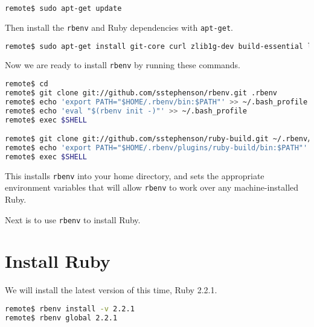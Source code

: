 \begin{minipage}{\linewidth}
\begin{lstlisting}[language=bash]
remote$ sudo apt-get update
\end{lstlisting}
\end{minipage}

Then install the \texttt{rbenv} and Ruby dependencies with \texttt{apt-get}.

\begin{minipage}{\linewidth}
\begin{lstlisting}[language=bash]
remote$ sudo apt-get install git-core curl zlib1g-dev build-essential libssl-dev libreadline-dev libyaml-dev libsqlite3-dev sqlite3 libxml2-dev libxslt1-dev libcurl4-openssl-dev python-software-properties libffi-dev
\end{lstlisting}
\end{minipage}

Now we are ready to install \texttt{rbenv} by running these commands.

\begin{minipage}{\linewidth}
\begin{lstlisting}[language=bash]
remote$ cd
remote$ git clone git://github.com/sstephenson/rbenv.git .rbenv
remote$ echo 'export PATH="$HOME/.rbenv/bin:$PATH"' >> ~/.bash_profile
remote$ echo 'eval "$(rbenv init -)"' >> ~/.bash_profile
remote$ exec $SHELL

remote$ git clone git://github.com/sstephenson/ruby-build.git ~/.rbenv/plugins/ruby-build
remote$ echo 'export PATH="$HOME/.rbenv/plugins/ruby-build/bin:$PATH"' >> ~/.bash_profile
remote$ exec $SHELL
\end{lstlisting}
\end{minipage}

This installs \texttt{rbenv} into your home directory, and sets the appropriate
environment variables that will allow \texttt{rbenv} to work over any
machine-installed Ruby.

Next is to use \texttt{rbenv} to install Ruby.

\section{Install Ruby}

We will install the latest version of this time, Ruby 2.2.1.

\begin{minipage}{\linewidth}
\begin{lstlisting}[language=bash]
remote$ rbenv install -v 2.2.1
remote$ rbenv global 2.2.1
\end{lstlisting}
\end{minipage}

